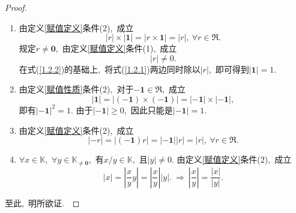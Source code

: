 \documentclass[UTF8, twoside]{ctexart}
\theoremstyle{nonumberplain}
\newtheorem{proof}{\heiti 证明}  %
\theoremstyle{nonumberplain}
\theoremstyle{plain}
\begin{document}
	\begin{proof}
		\phantom{哈哈}
		\begin{enumerate}
			\item 由定义\ref{赋值定义}条件(2),\ 成立
			\begin{equation} \label{1.2.1}
				\left| r \right| \times \left| \bm{1} \right| = 
				\left| r \times \bm{1} \right| = \left| r \right|,\ \forall r \in \Re.
			\end{equation}
			规定$r \ne \bm{0}$,\ 由定义\ref{赋值定义}条件(1),\ 成立
			\begin{equation} \label{1.2.2}
				\left| r \right| \ne 0.
			\end{equation}
			在式(\ref{1.2.2})的基础上,\ 将式(\ref{1.2.1})两边同时除以$\left| r \right|$,\ 即可得到$\left| \bm{1} \right| = 1$.
			\vskip 0.3cm
			
			\item 由定义\ref{赋值性质}条件(2),\ 对于$-\bm{1} \in \Re$,\ 成立
			\begin{equation*}
				\left| \bm{1} \right| = \left| \left( -\bm{1} \right) \times \left( -\bm{1} \right) \right| = 
				\left| -\bm{1} \right| \times \left| -\bm{1} \right|,
			\end{equation*}
			即有$\left| -\bm{1} \right|^2 = 1$. 由于$\left| -\bm{1} \right| \ge 0$,\ 因此只能是$\left| -\bm{1} \right| = 1$.
			\vskip 0.3cm
			
			\item 由定义\ref{赋值定义}条件(2),\ 成立
			\begin{equation*}
				\left| -r \right| = \left| \left( -\bm{1} \right) r \right| = 
				\left| -\bm{1} \right| \left| r \right| = \left| r \right|,\ \forall r \in \Re.
			\end{equation*}
			\vskip 0.3cm
			
			\item $\forall x \in \mathbb{K}$,\ $\forall y \in \mathbb{K}_{\ne \bm{0}}$,\ 有$x/y \in \mathbb{K}$,\ 且$\left| y \right|\ne 0$. 
			由定义\ref{赋值定义}条件(2),\ 成立
			\begin{equation*}
				\left| x \right| = 
				\left| \frac{x}{y} y \right| = 
				\left| \frac{x}{y} \right| \left| y \right|.\ 
				\Longrightarrow
				\ \left| \frac{x}{y} \right| = 
				\frac{\left| x \right|}{\left| y \right|}. 
			\end{equation*}
		\end{enumerate}
	\vskip 0.3cm
	至此,\ 明所欲证.\ 
	\end{proof}
	\vskip 0.5cm
	
\end{document}
